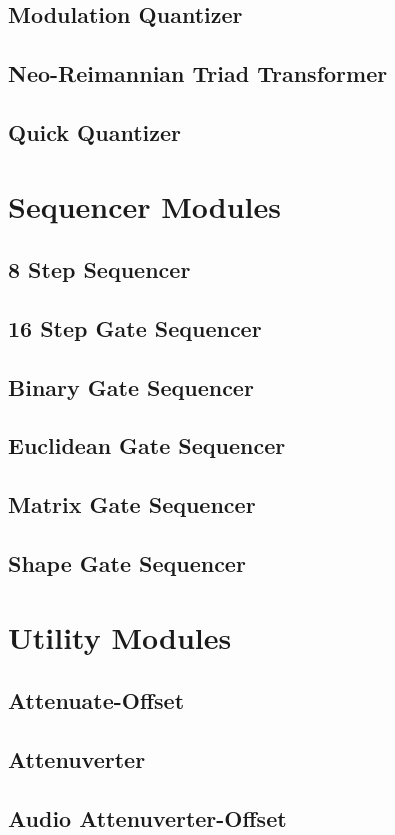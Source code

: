 \documentclass[11pt]{book}
\begin{document}
\section{Modulation Quantizer}
\section{Neo-Reimannian Triad Transformer}
\section{Quick Quantizer}

\chapter{Sequencer Modules}
\section{8 Step Sequencer}
\section{16 Step Gate Sequencer}
\section{Binary Gate Sequencer}
\section{Euclidean Gate Sequencer}
\section{Matrix Gate Sequencer}
\section{Shape Gate Sequencer}

\chapter{Utility Modules}
\section{Attenuate-Offset}
\section{Attenuverter}
\section{Audio Attenuverter-Offset}
\end{document}
